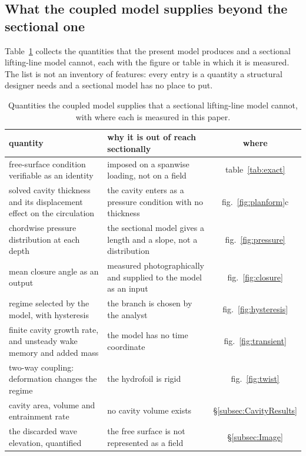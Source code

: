 \documentclass[11pt,a4paper]{article}
\begin{document}
\subsection{What the coupled model supplies beyond the sectional one}
\label{subsec:Beyond}

Table~\ref{tab:beyond} collects the quantities that the present model produces
and a sectional lifting-line model cannot, each with the figure or table in which
it is measured. The list is not an inventory of features: every entry is a
quantity a structural designer needs and a sectional model has no place to put.

\begin{table}[t]
  \centering
  \caption{Quantities the coupled model supplies that a sectional lifting-line
    model cannot, with where each is measured in this paper.}
  \label{tab:beyond}
  \small
  \begin{tabular}{p{}p{}c}
    \toprule
    quantity & why it is out of reach sectionally & where \\
    \midrule
    free-surface condition verifiable as an identity
      & imposed on a spanwise loading, not on a field
      & table~\ref{tab:exact} \\
    solved cavity thickness and its displacement effect on the circulation
      & the cavity enters as a pressure condition with no thickness
      & fig.~\ref{fig:planform}c \\
    chordwise pressure distribution at each depth
      & the sectional model gives a length and a slope, not a distribution
      & fig.~\ref{fig:pressure} \\
    mean closure angle as an output
      & measured photographically and supplied to the model as an input
      & fig.~\ref{fig:closure} \\
    regime selected by the model, with hysteresis
      & the branch is chosen by the analyst
      & fig.~\ref{fig:hysteresis} \\
    finite cavity growth rate, and unsteady wake memory and added mass
      & the model has no time coordinate
      & fig.~\ref{fig:transient} \\
    two-way coupling: deformation changes the regime
      & the hydrofoil is rigid
      & fig.~\ref{fig:twist} \\
    cavity area, volume and entrainment rate
      & no cavity volume exists
      & \S\ref{subsec:CavityResults} \\
    the discarded wave elevation, quantified
      & the free surface is not represented as a field
      & \S\ref{subsec:Image} \\
  \end{tabular}
\end{table}
\end{document}
